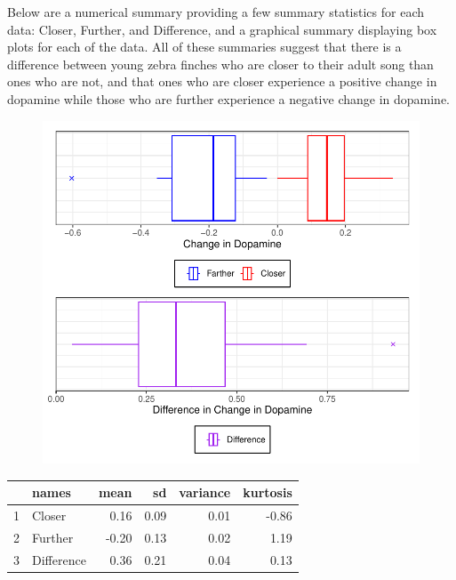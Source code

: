 \documentclass{article}\usepackage[]{graphicx}\usepackage[]{xcolor}
\begin{document}
\begin{enumerate}
Below are a numerical summary providing a few summary statistics for each data: Closer, Further, and Difference, and a graphical summary displaying box plots for each of the data. All of these summaries suggest that there is a difference between young zebra finches who are closer to their adult song than ones who are not, and that ones who are closer experience a positive change in dopamine while those who are further experience a negative change in dopamine.

\begin{figure}[ht]
\centering
\includegraphics[scale = 0.5]{comb_box.pdf}
\end{figure}

\begin{table}[ht]
\centering
\begin{tabular}{rlrrrr}
  \hline
 & names & mean & sd & variance & kurtosis \\ 
  \hline
1 & Closer & 0.16 & 0.09 & 0.01 & -0.86 \\ 
  2 & Further & -0.20 & 0.13 & 0.02 & 1.19 \\ 
  3 & Difference & 0.36 & 0.21 & 0.04 & 0.13 \\ 
   \hline
\end{tabular}
\end{table}


\end{enumerate}
\end{document}
